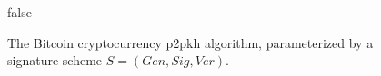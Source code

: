 \begin{figure}[t]
\begin{algorithm}[H]
    \caption{\label{alg.bitcoin} The Bitcoin cryptocurrency p2pkh algorithm,
    parameterized by a signature scheme $S = (Gen, Sig, Ver)$.}
    \begin{algorithmic}[1]
            \State{}
        \EndFunction
                \State\Return\textsf{false}
            \EndIf
            \State{}
        \EndFunction
        \vskip8pt
    \end{algorithmic}
\end{algorithm}
\end{figure}
